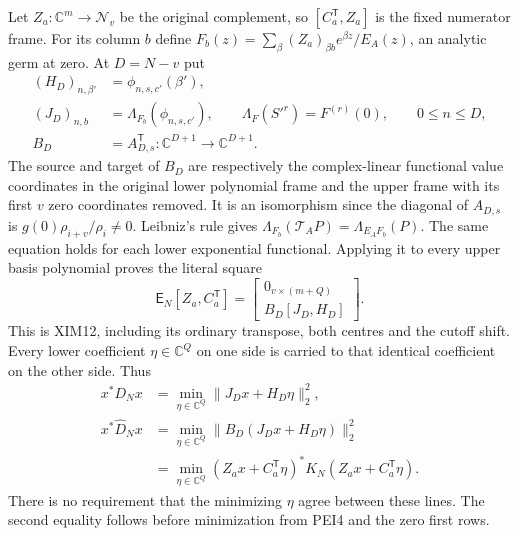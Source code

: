 \documentclass[11pt,a4paper]{article}
\begin{document}
Let $Z_a:\mathbb C^m\to\mathscr N_v$ be the original complement,
so $[C_a^{\mathsf T},Z_a]$ is the fixed numerator frame. For its
column $b$ define
$F_b(z)=\sum_\beta (Z_a)_{\beta b}e^{\beta z}/E_A(z)$,
an analytic germ at zero. At $D=N-v$ put
\[
 \begin{split}
 (H_D)_{n,\beta'}&=\phi_{n,s,c'}(\beta'),\\
 (J_D)_{n,b}&=\Lambda_{F_b}(\phi_{n,s,c'}),\qquad
      \Lambda_F(S'^r)=F^{(r)}(0),\qquad 0\le n\le D,\\
 B_D&=A_{D,s}^{\mathsf T}:\mathbb C^{D+1}\longrightarrow
                         \mathbb C^{D+1}.
 \end{split}                                                     \tag{PEI3}
\]
The source and target of $B_D$ are respectively the complex-linear
functional value coordinates in the original lower polynomial frame
and the upper frame with its first $v$ zero coordinates removed.
It is an isomorphism since the diagonal of $A_{D,s}$ is
$g(0)\rho_{i+v}/\rho_i\ne0$.
Leibniz's rule gives
$\Lambda_{F_b}(\mathcal T_AP)=\Lambda_{E_AF_b}(P)$.
The same equation holds for each lower exponential functional.
Applying it to every upper basis polynomial proves the literal square
\[
 \mathsf E_N[Z_a,C_a^{\mathsf T}]
   =\begin{bmatrix}
       0_{v\times(m+Q)}\\
       B_D[J_D,H_D]
     \end{bmatrix}.                                             \tag{PEI4}
\]
This is XIM12, including its ordinary transpose, both centres and the
cutoff shift. Every lower coefficient $\eta\in\mathbb C^Q$ on one side
is carried to that identical coefficient on the other side. Thus
\[
 \begin{split}
 x^*D_Nx&=\min_{\eta\in\mathbb C^Q}
                          \|J_Dx+H_D\eta\|_2^2,\\
 x^*\widehat D_Nx&=\min_{\eta\in\mathbb C^Q}
                          \|B_D(J_Dx+H_D\eta)\|_2^2\\
 &=\min_{\eta\in\mathbb C^Q}
                  (Z_ax+C_a^{\mathsf T}\eta)^*K_N
                         (Z_ax+C_a^{\mathsf T}\eta).
 \end{split}                                                     \tag{PEI5}
\]
There is no requirement that the minimizing $\eta$ agree between
these lines. The second equality follows before minimization from
PEI4 and the zero first rows.
\end{document}

